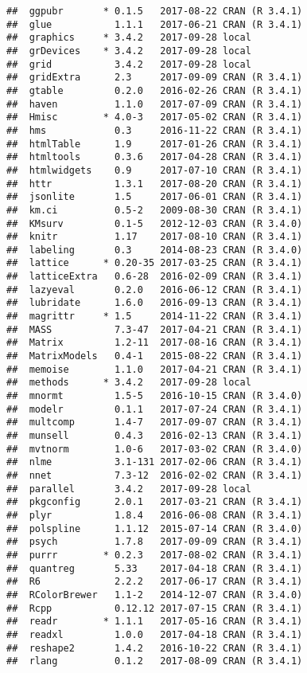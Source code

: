 \documentclass[]{book}
\theoremstyle{definition}
\theoremstyle{definition}
\theoremstyle{definition}
\theoremstyle{remark}
\begin{document}
\begin{verbatim}
##  ggpubr       * 0.1.5   2017-08-22 CRAN (R 3.4.1)
##  glue           1.1.1   2017-06-21 CRAN (R 3.4.1)
##  graphics     * 3.4.2   2017-09-28 local         
##  grDevices    * 3.4.2   2017-09-28 local         
##  grid           3.4.2   2017-09-28 local         
##  gridExtra      2.3     2017-09-09 CRAN (R 3.4.1)
##  gtable         0.2.0   2016-02-26 CRAN (R 3.4.1)
##  haven          1.1.0   2017-07-09 CRAN (R 3.4.1)
##  Hmisc        * 4.0-3   2017-05-02 CRAN (R 3.4.1)
##  hms            0.3     2016-11-22 CRAN (R 3.4.1)
##  htmlTable      1.9     2017-01-26 CRAN (R 3.4.1)
##  htmltools      0.3.6   2017-04-28 CRAN (R 3.4.1)
##  htmlwidgets    0.9     2017-07-10 CRAN (R 3.4.1)
##  httr           1.3.1   2017-08-20 CRAN (R 3.4.1)
##  jsonlite       1.5     2017-06-01 CRAN (R 3.4.1)
##  km.ci          0.5-2   2009-08-30 CRAN (R 3.4.1)
##  KMsurv         0.1-5   2012-12-03 CRAN (R 3.4.0)
##  knitr          1.17    2017-08-10 CRAN (R 3.4.1)
##  labeling       0.3     2014-08-23 CRAN (R 3.4.0)
##  lattice      * 0.20-35 2017-03-25 CRAN (R 3.4.1)
##  latticeExtra   0.6-28  2016-02-09 CRAN (R 3.4.1)
##  lazyeval       0.2.0   2016-06-12 CRAN (R 3.4.1)
##  lubridate      1.6.0   2016-09-13 CRAN (R 3.4.1)
##  magrittr     * 1.5     2014-11-22 CRAN (R 3.4.1)
##  MASS           7.3-47  2017-04-21 CRAN (R 3.4.1)
##  Matrix         1.2-11  2017-08-16 CRAN (R 3.4.1)
##  MatrixModels   0.4-1   2015-08-22 CRAN (R 3.4.1)
##  memoise        1.1.0   2017-04-21 CRAN (R 3.4.1)
##  methods      * 3.4.2   2017-09-28 local         
##  mnormt         1.5-5   2016-10-15 CRAN (R 3.4.0)
##  modelr         0.1.1   2017-07-24 CRAN (R 3.4.1)
##  multcomp       1.4-7   2017-09-07 CRAN (R 3.4.1)
##  munsell        0.4.3   2016-02-13 CRAN (R 3.4.1)
##  mvtnorm        1.0-6   2017-03-02 CRAN (R 3.4.0)
##  nlme           3.1-131 2017-02-06 CRAN (R 3.4.1)
##  nnet           7.3-12  2016-02-02 CRAN (R 3.4.1)
##  parallel       3.4.2   2017-09-28 local         
##  pkgconfig      2.0.1   2017-03-21 CRAN (R 3.4.1)
##  plyr           1.8.4   2016-06-08 CRAN (R 3.4.1)
##  polspline      1.1.12  2015-07-14 CRAN (R 3.4.0)
##  psych          1.7.8   2017-09-09 CRAN (R 3.4.1)
##  purrr        * 0.2.3   2017-08-02 CRAN (R 3.4.1)
##  quantreg       5.33    2017-04-18 CRAN (R 3.4.1)
##  R6             2.2.2   2017-06-17 CRAN (R 3.4.1)
##  RColorBrewer   1.1-2   2014-12-07 CRAN (R 3.4.0)
##  Rcpp           0.12.12 2017-07-15 CRAN (R 3.4.1)
##  readr        * 1.1.1   2017-05-16 CRAN (R 3.4.1)
##  readxl         1.0.0   2017-04-18 CRAN (R 3.4.1)
##  reshape2       1.4.2   2016-10-22 CRAN (R 3.4.1)
##  rlang          0.1.2   2017-08-09 CRAN (R 3.4.1)

\end{verbatim}
\end{document}
